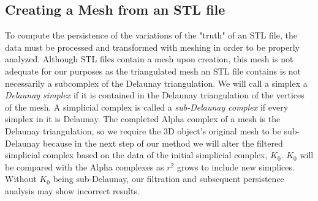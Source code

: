 \documentclass[ma]{uncgdissertationexp}
\theoremstyle{plain}
\theoremstyle{definition}
\theoremstyle{remark}
\begin{document}
\subsection{Creating a Mesh from an STL file}
\label{sec:mesh_from_stl}
\par To compute the persistence of the variations of the "truth" of an STL file, the data must be processed and transformed with meshing in order to be properly analyzed. Although STL files contain a mesh upon creation, this mesh is not adequate for our purposes as the triangulated mesh an STL file contains is not necessarily a subcomplex of the Delaunay triangulation. We will call a simplex a \textit{Delaunay simplex} if it is contained in the Delaunay triangulation of the vertices of the mesh. A simplicial complex is called a \textit{sub-Delaunay complex} if every simplex in it is Delaunay. The completed Alpha complex of a mesh is the Delaunay triangulation, so we require the 3D object's original mesh to be sub-Delaunay because in the next step of our method we will alter the filtered simplicial complex based on the data of the initial simplicial complex, $K_{0}$. $K_{0}$ will be compared with the Alpha complexes as $r^2$ grows to include new simplices. Without $K_0$ being sub-Delaunay, our filtration and subsequent persistence analysis may show incorrect results. 
\end{document}

